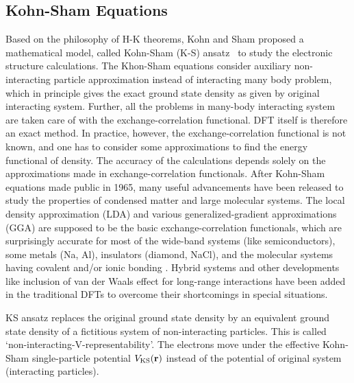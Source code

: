 \subsection{Kohn-Sham Equations}
Based on the philosophy of H-K theorems, Kohn and Sham proposed a mathematical model, called Kohn-Sham (K-S) ansatz~\citep{Kohn1965} to study the electronic structure calculations. The Khon-Sham equations consider auxiliary non-interacting particle approximation instead of interacting many body problem, which in principle gives the exact ground state density as given by original interacting system. Further, all the problems in many-body interacting system are taken care of with the exchange-correlation functional. DFT itself is therefore an exact method. In practice, however, the exchange-correlation functional is not known, and one has to consider some approximations to find the energy functional of density. The accuracy of the calculations depends solely on the approximations made in exchange-correlation functionals. After Kohn-Sham equations made public in 1965, many useful advancements have been released to study the properties of condensed matter and large molecular systems. The local density approximation (LDA) and various generalized-gradient approximations (GGA) are supposed to be the basic exchange-correlation functionals, which are surprisingly accurate for most of the wide-band systems (like semiconductors), some metals (Na, Al), insulators (diamond, NaCl), and the molecular systems having covalent and/or ionic bonding \citep{Martin2004}. Hybrid systems \citep{Becke1993, Adamo1999} and other developments like inclusion of van der Waals effect for long-range interactions \citep{Klime2012} have been added in the traditional DFTs to overcome their shortcomings in special situations.

KS ansatz replaces the original ground state density by an equivalent ground state density of a fictitious system of non-interacting particles. This is called `non-interacting-V-representability'. The electrons move under the effective Kohn-Sham single-particle potential $V_{\text{KS}}({\bf r})$ instead of the potential of original system (interacting particles).

